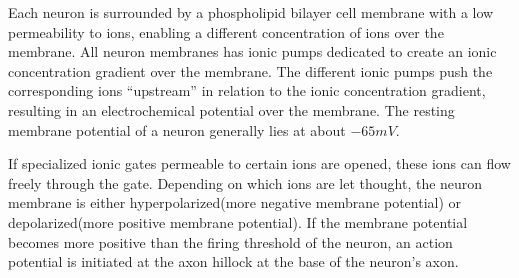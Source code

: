 		



		Each neuron is surrounded by a phospholipid bilayer cell membrane with a low permeability to ions, enabling a different concentration of ions over the membrane.
		All neuron membranes has ionic pumps dedicated to create an ionic concentration gradient over the membrane.
		The different ionic pumps push the corresponding ions ``upstream'' in relation to the ionic concentration gradient, resulting in an electrochemical potential over the membrane.
		The resting membrane potential of a neuron generally lies at about $-65mV$. 
		\cite{NeuroscienceExploringTheBrain3edKAP3} %

		If specialized ionic gates permeable to certain ions are opened, these ions can flow freely through the gate.
		Depending on which ions are let thought, the neuron membrane is either hyperpolarized(more negative membrane potential) or depolarized(more positive membrane potential).
		If the membrane potential becomes more positive than the firing threshold of the neuron, an action potential is initiated at the axon hillock at the base of the neuron's axon. 
		\cite{PrinciplesOfNeuralScience4edKAP07}







